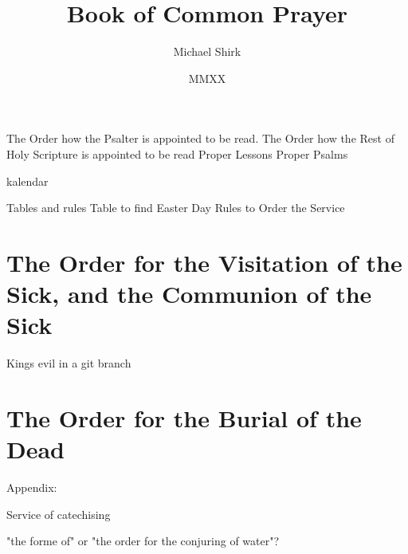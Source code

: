 \documentclass[foolscapvopaper,10pt,twoside,openany,extrafontsizes,final]{memoir}
\begin{document}
\frontmatter
\title{Book of Common Prayer}
\author{Michael Shirk}
\date{MMXX}



\tableofcontents*


The Order how the Psalter is appointed to be read.
The Order how the Rest of Holy Scripture is appointed to be read
Proper Lessons
Proper Psalms


kalendar

Tables and rules
Table to find Easter Day
Rules to Order the Service

\mainmatter























\chapter{The Order for the Visitation of the Sick, and the Communion of the Sick}

Kings evil in a git branch

\chapter{The Order for the Burial of the Dead}








Appendix:

Service of catechising

"the forme of" or "the order for the conjuring of water"?
\end{document}
